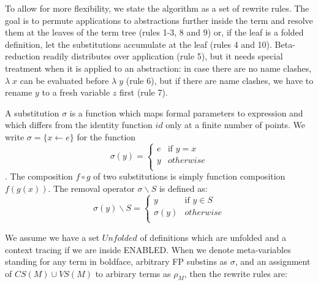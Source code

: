 \documentclass[a4paper]{article}
\newcommand{\fpsubstin}[1]{\{#1\}}
\newcommand{\fpscat}[0]{\circ}
\newcommand{\fpwith}{\leftarrow}
\newcommand{\fpwithout}[0]{\backslash}
\begin{document}
To allow for more flexibility, we state the algorithm as a set of rewrite
 rules. The goal is to permute applications to abstractions further inside the
 term and resolve them at the leaves of the term tree (rules 1-3, 8 and 9) or,
 if the leaf is a folded definition, let the substitutions accumulate at the
 leaf (rules 4 and 10). Beta-reduction readily distributes over application
 (rule 5), but it needs special treatment when it is applied to an abstraction:
 in case there are no name clashes, $\lambda\; x$ can be evaluated before
 $\lambda\; y$ (rule 6), but if there are name clashes, we have to rename
 $y$ to a fresh variable $z$ first (rule 7).

A substitution $\sigma$ is a function which maps formal parameters
 to expression and which differs from the identity function $id$ only at a
 finite number of points. We write $\sigma=\fpsubstin{x \fpwith e}$ for the
 function \[\sigma(y)=\left\{
     \begin{array}{ll}
       e& \mbox{if }y = x\\
       y & otherwise\\
     \end{array}\right.
\]. The composition $f \fpscat g$ of two substitutions is simply function
 composition $f(g(x))$. The removal operator $\sigma\fpwithout S$ is defined
 as: \[\sigma(y)\fpwithout S =
   \left\{\begin{array}{ll}
     y &\mbox{if }y \in S\\
     \sigma(y) & otherwise\\
   \end{array}\right.
\]


We assume we have a set $Unfolded$ of definitions which are unfolded and
 a context tracing if we are inside ENABLED. When we denote meta-variables
 standing for any term in boldface, arbitrary FP substins as $\sigma$,
 and an assignment of $CS(M)\cup VS(M)$ to arbirary terms as $\rho_M$,
 then the rewrite rules are:\\
\end{document}
